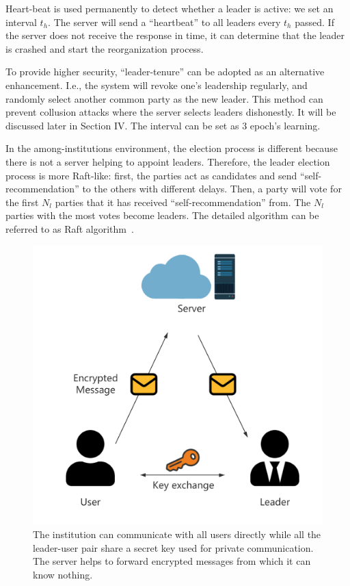Heart-beat is used permanently to detect whether a leader is active: we set an interval $t_h$. The server will send a ``heartbeat'' to all leaders every $t_h$ passed. If the server does not receive the response in time, it can determine that the leader is crashed and start the reorganization process.

To provide higher security, ``leader-tenure'' can be adopted as an alternative enhancement. I.e., the system will revoke one's leadership regularly, and randomly select another common party as the new leader. This method can prevent collusion attacks where the server selects leaders dishonestly. It will be discussed later in Section IV. The interval can be set as 3 epoch's learning.

In the among-institutions environment, the election process is different because there is not a server helping to appoint leaders. Therefore, the leader election process is more Raft-like: first, the parties act as candidates and send ``self-recommendation'' to the others with different delays. Then, a party will vote for the first $N_l$ parties that it has received ``self-recommendation'' from. The $N_l$ parties with the most votes become leaders. The detailed algorithm can be referred to as Raft algorithm~\cite{Raft}.

\begin{figure}[!ht]
    \centering
    \includegraphics[width=\columnwidth]{img/leader-user.png}
    \caption{The institution can communicate with all users directly while all the leader-user pair share a secret key used for private communication. The server helps to forward encrypted messages from which it can know nothing.}
    \label{leader-user}
\end{figure}

